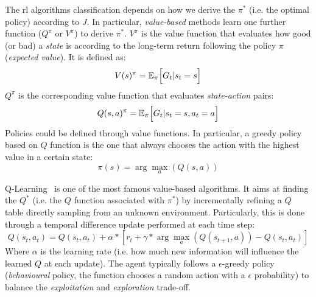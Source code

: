 The \ac{rl} algorithms classification depends on how we derive the $\pi^*$ (i.e. the optimal policy) according to $J$.
%
%
In particular, \emph{value-based} methods learn one further function ($Q^\pi$ or $V^\pi$) to derive $\pi^*$.
%
$V^\pi$ is the value function that evaluates how good (or bad) a \emph{state} is according to the long-term return following the policy $\pi$ (\emph{expected value}).
% 
It is defined as:
\begin{equation}
V(s)^\pi = \mathbb{E}_\pi \Big[ G_t | s_t = s \Big]
\end{equation}
$Q^\pi$ is the corresponding value function that evaluates \emph{state-action} pairs:
\begin{equation}
Q(s, a)^\pi = \mathbb{E}_\pi \Big[ G_t | s_t = s, a_t = a \Big]
\end{equation}
Policies could be defined through value functions. In particular, a greedy policy based on $Q$ function is the one that always chooses the action with the highest value in a certain state:
\begin{equation}
\pi(s) = \arg \max_{a}(Q(s, a))
\end{equation}

Q-Learning~\cite{DBLP:journals/ml/WatkinsD92} is one of the most famous value-based algorithms. 
 It aims at finding the $Q^*$ (i.e. the $Q$ function associated with $\pi^*$) by incrementally refining a $Q$ table directly sampling from an unknown environment.
%
Particularly, this is done through a temporal difference update performed at each time step:
\begin{equation}
Q(s_t, a_t) = Q(s_t, a_t) + \alpha *  [r_t + \gamma * \arg \max_{a}(Q(s_{t+1}, a)) - Q(s_t, a_t)]
\end{equation}
Where $\alpha$ is the learning rate (i.e. how much new information will influence the learned $Q$ at each update). 
%
The agent typically follows a $\epsilon$-greedy policy (\emph{behavioural} policy, the function chooses a random action with a $\epsilon$ probability) to balance the \emph{exploitation} and \emph{exploration} trade-off. 

